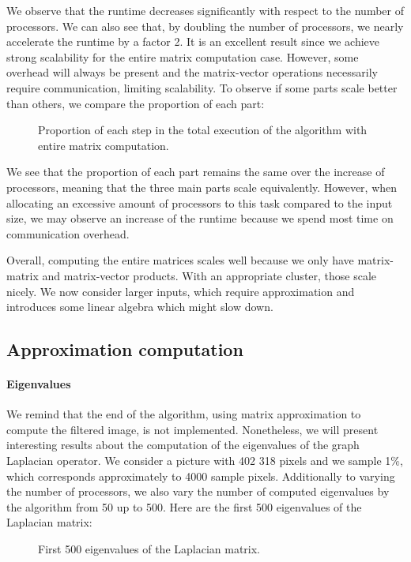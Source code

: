 We observe that the runtime decreases significantly with respect to the number of processors.
We can also see that, by doubling the number of processors, we nearly accelerate the runtime by a factor 2.
It is an excellent result since we achieve strong scalability for the entire matrix computation case.
However, some overhead will always be present and the matrix-vector operations necessarily require communication, limiting scalability.
To observe if some parts scale better than others, we compare the proportion of each part:
\begin{figure}[H]
  \centering
  
  \caption{Proportion of each step in the total execution of the algorithm with entire matrix computation.}
\end{figure}

We see that the proportion of each part remains the same over the increase of processors, meaning that the three main parts scale equivalently.
However, when allocating an excessive amount of processors to this task compared to the input size, we may observe an increase of the runtime because we spend most time on communication overhead.

Overall, computing the entire matrices scales well because we only have matrix-matrix and matrix-vector products.
With an appropriate cluster, those scale nicely.
We now consider larger inputs, which require approximation and introduces some linear algebra which might slow down.

\subsection{Approximation computation}

\paragraph{Eigenvalues}
We remind that the end of the algorithm, using matrix approximation to compute the filtered image, is not implemented.
Nonetheless, we will present interesting results about the computation of the eigenvalues of the graph Laplacian operator.
We consider a picture with 402 318 pixels and we sample 1\%, which corresponds approximately to 4000 sample pixels.
Additionally to varying the number of processors, we also vary the number of computed eigenvalues by the algorithm from 50 up to 500.
Here are the first 500 eigenvalues of the Laplacian matrix:

\begin{figure}[H]
  \centering
  
  \caption{First 500 eigenvalues of the Laplacian matrix.}
\end{figure}

